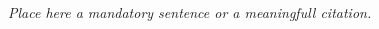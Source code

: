 

\begin{titlepage}


\null  %


\vfill\vfill\vfill\vfill


\begin{center}
    \begin{boxedminipage}{1\textwidth} \centering
        \vspace*{1.2em}{\Huge \projectTitle}\vspace*{1.2em}
    \end{boxedminipage}
    \vspace*{2em}\par

    \authorFirstName{} \textsc{\authorLastName}
    \vspace*{6em}\par

    \small{\emph{Place here a mandatory sentence or a meaningfull citation.}}
\end{center}


\vfill\vfill





\end{titlepage}
